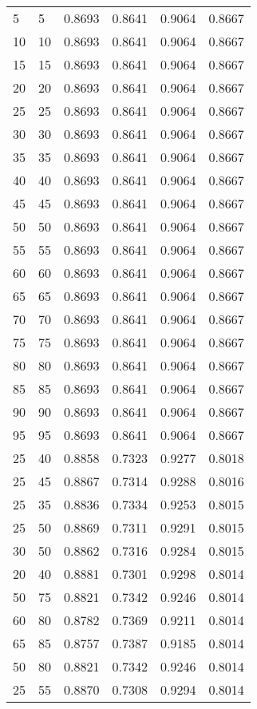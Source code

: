 \begin{center}
\begin{longtable}{|l|l|l|l|l|l|}
5  & 5  & 0.8693 & 0.8641 & 0.9064 & 0.8667 \\
10 & 10 & 0.8693 & 0.8641 & 0.9064 & 0.8667 \\
15 & 15 & 0.8693 & 0.8641 & 0.9064 & 0.8667 \\
20 & 20 & 0.8693 & 0.8641 & 0.9064 & 0.8667 \\
25 & 25 & 0.8693 & 0.8641 & 0.9064 & 0.8667 \\
30 & 30 & 0.8693 & 0.8641 & 0.9064 & 0.8667 \\
35 & 35 & 0.8693 & 0.8641 & 0.9064 & 0.8667 \\
40 & 40 & 0.8693 & 0.8641 & 0.9064 & 0.8667 \\
45 & 45 & 0.8693 & 0.8641 & 0.9064 & 0.8667 \\
50 & 50 & 0.8693 & 0.8641 & 0.9064 & 0.8667 \\
55 & 55 & 0.8693 & 0.8641 & 0.9064 & 0.8667 \\
60 & 60 & 0.8693 & 0.8641 & 0.9064 & 0.8667 \\
65 & 65 & 0.8693 & 0.8641 & 0.9064 & 0.8667 \\
70 & 70 & 0.8693 & 0.8641 & 0.9064 & 0.8667 \\
75 & 75 & 0.8693 & 0.8641 & 0.9064 & 0.8667 \\
80 & 80 & 0.8693 & 0.8641 & 0.9064 & 0.8667 \\
85 & 85 & 0.8693 & 0.8641 & 0.9064 & 0.8667 \\
90 & 90 & 0.8693 & 0.8641 & 0.9064 & 0.8667 \\
95 & 95 & 0.8693 & 0.8641 & 0.9064 & 0.8667 \\
25 & 40 & 0.8858 & 0.7323 & 0.9277 & 0.8018 \\
25 & 45 & 0.8867 & 0.7314 & 0.9288 & 0.8016 \\
25 & 35 & 0.8836 & 0.7334 & 0.9253 & 0.8015 \\
25 & 50 & 0.8869 & 0.7311 & 0.9291 & 0.8015 \\
30 & 50 & 0.8862 & 0.7316 & 0.9284 & 0.8015 \\
20 & 40 & 0.8881 & 0.7301 & 0.9298 & 0.8014 \\
50 & 75 & 0.8821 & 0.7342 & 0.9246 & 0.8014 \\
60 & 80 & 0.8782 & 0.7369 & 0.9211 & 0.8014 \\
65 & 85 & 0.8757 & 0.7387 & 0.9185 & 0.8014 \\
50 & 80 & 0.8821 & 0.7342 & 0.9246 & 0.8014 \\
25 & 55 & 0.8870 & 0.7308 & 0.9294 & 0.8014 \\

\end{longtable}
\end{center}
